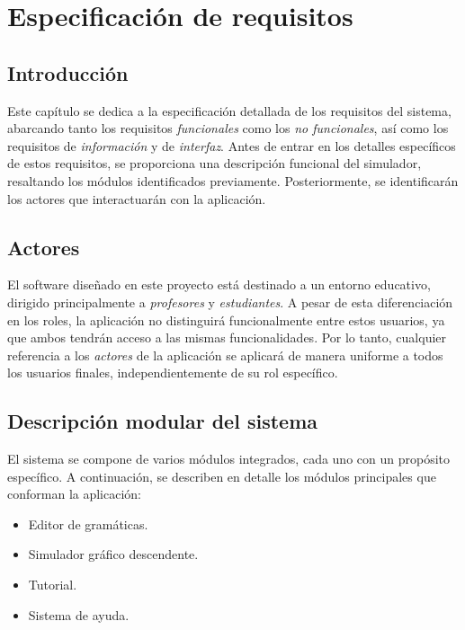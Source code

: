 \chapter{Especificación de requisitos}\label{cap:especificacion_requisitos}

\section{Introducción}

Este capítulo se dedica a la especificación detallada de los requisitos del sistema, abarcando tanto los requisitos \textit{funcionales} como los \textit{no funcionales}, así como los requisitos de \textit{información} y de \textit{interfaz}. Antes de entrar en los detalles específicos de estos requisitos, se proporciona una descripción funcional del simulador, resaltando los módulos identificados previamente. Posteriormente, se identificarán los actores que interactuarán con la aplicación.

\section{Actores} \label{sec:actores-req}

El software diseñado en este proyecto está destinado a un entorno educativo, dirigido principalmente a \textit{profesores} y \textit{estudiantes}. A pesar de esta diferenciación en los roles, la aplicación no distinguirá funcionalmente entre estos usuarios, ya que ambos tendrán acceso a las mismas funcionalidades. Por lo tanto, cualquier referencia a los \textit{actores} de la aplicación se aplicará de manera uniforme a todos los usuarios finales, independientemente de su rol específico.


\section{Descripción modular del sistema}

El sistema se compone de varios módulos integrados, cada uno con un propósito específico. A continuación, se describen en detalle los módulos principales que conforman la aplicación:

\begin{itemize}
\item Editor de gramáticas.
\item Simulador gráfico descendente.
\item Tutorial.
\item Sistema de ayuda.
\end{itemize}

